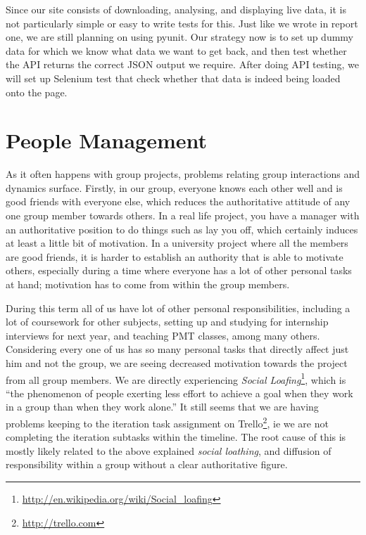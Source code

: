 \documentclass[a4paper,12pt]{article}
\begin{document}
	Since our site consists of downloading, analysing, and displaying live data, it is not particularly simple or easy to write tests for this. Just like we wrote in report one, we are still planning on using pyunit. Our strategy now is to set up dummy data for which we know what data we want to get back, and then test whether the API returns the correct JSON output we require. After doing API testing, we will set up Selenium test that check whether that data is indeed being loaded onto the page.
	
	\section{People Management}
	
	As it often happens with group projects, problems relating group interactions and dynamics surface. Firstly, in our group, everyone knows each other well and is good friends with everyone else, which reduces the authoritative attitude of any one group member towards others. In a real life project, you have a manager with an authoritative position to do things such as lay you off, which certainly induces at least a little bit of motivation. In a university project where all the members are good friends, it is harder to establish an authority that is able to motivate others, especially during a time where everyone has a lot of other personal tasks at hand; motivation has to come from within the group members.
	
	During this term all of us have lot of other personal responsibilities, including a lot of coursework for other subjects, setting up and studying for internship interviews for next year, and teaching PMT classes, among many others. Considering every one of us has so many personal tasks that directly affect just him and not the group, we are seeing decreased motivation towards the project from all group members. We are directly experiencing \emph{Social Loafing}\footnote{\url{http://en.wikipedia.org/wiki/Social_loafing}}, which is ``the phenomenon of people exerting less effort to achieve a goal when they work in a group than when they work alone.'' It still seems that we are having problems keeping to the iteration task assignment on Trello\footnote{\url{http://trello.com}}, ie we are not completing the iteration subtasks within the timeline. The root cause of this is mostly likely related to the above explained \emph{social loathing}, and diffusion of responsibility within a group without a clear authoritative figure.
	
\end{document}
